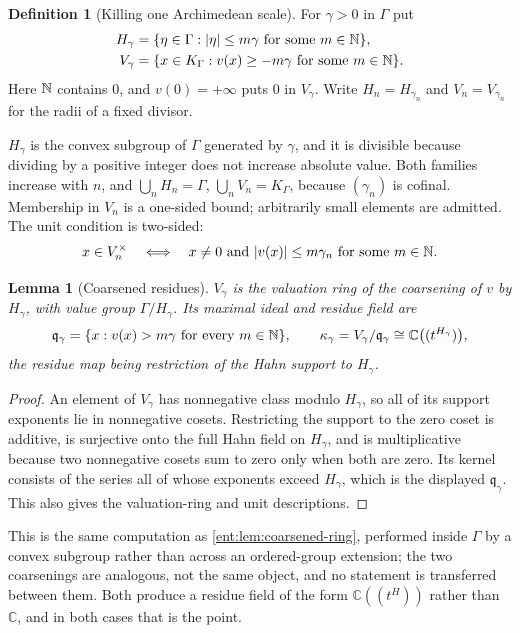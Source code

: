 \documentclass[11pt]{article}
\theoremstyle{plain}
\newtheorem{lemma}[lemma]{Lemma}
\theoremstyle{plain}
\theoremstyle{plain}
\theoremstyle{definition}
\newtheorem{definition}[definition]{Definition}
\theoremstyle{definition}
\theoremstyle{definition}
\theoremstyle{definition}
\theoremstyle{remark}
\newcommand{\C}{\mathbb C}\newcommand{\R}{\mathbb R}
\newcommand{\K}{K_\Gamma}\newcommand{\KD}{K_\Delta}
\newcommand{\abs}[1]{\lvert#1\rvert}
\begin{document}
\begin{definition}[Killing one Archimedean scale]\label{ent:def:coarse}
For $\gamma>0$ in $\Gamma$ put
\begin{align}
 H_\gamma&=\{\eta\in\Gamma:\abs{\eta}\le m\gamma\text{ for some }m\in\N\},
 \label{ent:eq:Hgamma}\\
 V_\gamma&=\{x\in\K:v(x)\ge-m\gamma\text{ for some }m\in\N\}.
 \label{ent:eq:Vgamma}
\end{align}
Here $\mathbb N$ contains $0$, and $v(0)=+\infty$ puts $0$ in $V_\gamma$. Write
$H_n=H_{\gamma_n}$ and $V_n=V_{\gamma_n}$ for the radii of a fixed divisor.
\end{definition}

$H_\gamma$ is the convex subgroup of $\Gamma$ generated by $\gamma$, and it is
divisible because dividing by a positive integer does not increase absolute
value. Both families increase with $n$, and
$\bigcup_nH_n=\Gamma$, $\bigcup_nV_n=\K$, because $(\gamma_n)$ is cofinal.
Membership in $V_n$ is a one-sided bound; arbitrarily small elements are
admitted. The unit condition is two-sided:
\begin{equation}\label{ent:eq:Vunits}
 x\in V_n^\times
 \quad\Longleftrightarrow\quad
 x\ne0\text{ and }\abs{v(x)}\le m\gamma_n\text{ for some }m\in\N .
\end{equation}

\begin{lemma}[Coarsened residues]\label{ent:lem:coarse-residue}
$V_\gamma$ is the valuation ring of the coarsening of $v$ by $H_\gamma$, with
value group $\Gamma/H_\gamma$. Its maximal ideal and residue field are
\[
 \mathfrak q_\gamma=\{x:v(x)>m\gamma\text{ for every }m\in\N\},
 \qquad
 \kappa_\gamma=V_\gamma/\mathfrak q_\gamma\cong\C\bigl((t^{H_\gamma})\bigr),
\]
the residue map being restriction of the Hahn support to $H_\gamma$.
\end{lemma}
\begin{proof}
An element of $V_\gamma$ has nonnegative class modulo $H_\gamma$, so all of
its support exponents lie in nonnegative cosets. Restricting the support to
the zero coset is additive, is surjective onto the full Hahn field on
$H_\gamma$, and is multiplicative because two nonnegative cosets sum to zero
only when both are zero. Its kernel consists of the series all of whose
exponents exceed $H_\gamma$, which is the displayed $\mathfrak q_\gamma$.
This also gives the valuation-ring and unit descriptions.
\end{proof}

This is the same computation as \cref{ent:lem:coarsened-ring}, performed
inside $\Gamma$ by a convex subgroup rather than across an ordered-group
extension; the two coarsenings are analogous, not the same object, and no
statement is transferred between them. Both produce a residue field of the
form $\C((t^H))$ rather than $\C$, and in both cases that is the point.
\end{document}
